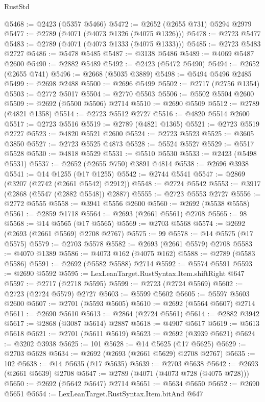 \begin{lexlean}{RustStd}
\begin{coremodule}
{\begin{coremodule}
{{{{{{{{{{{{{{{{{{{{{{{{{{{{{{{{{{{{{{{@5468 := @2423 (@5357 @5466)
@5472 := @2652 (@2655 @731) @5294 @2979
@5477 := @2789 (@4071 (@4073 @1326 (@4075 @1326)))
@5478 := @2723 @5477
@5483 := @2789 (@4071 (@4073 @1333 (@4075 @1333)))
@5485 := @2723 @5483 @2727
@5486 := @5478 @5485
@5487 := @3138 @5486
@5489 := @4069 @5487 @2600
@5490 := @2882 @5489
@5492 := @2423 (@5472 @5490)
@5494 := @2652 (@2655 @741)
@5496 := @2668 (@5035 @3889)
@5498 := @5494 @5496 @2485
@5499 := @2698 @2488
@5500 := @2696 @5499
@5502 := @2717 (@2756 @1354)
@5503 := @2772 @5017
@5504 := @2770 @5503
@5506 := @5502 @5504 @2600
@5509 := @2692 (@5500 @5506) @2714
@5510 := @2690 @5509
@5512 := @2789 (@4821 @1358)
@5514 := @2723 @5512 @2727
@5516 := @4820 @5514 @2600
@5517 := @2723 @5516
@5519 := @2789 (@4821 @1365)
@5521 := @2723 @5519 @2727
@5523 := @4820 @5521 @2600
@5524 := @2723 @5523
@5525 := @3605 @3850
@5527 := @2723 @5525 @4873
@5528 := @5524 @5527
@5529 := @5517 @5528
@5530 := @4818 @5529
@5531 := @5510 @5530
@5533 := @2423 (@5498 @5531)
@5537 := @2652 (@2655 @750) @3891 @4814
@5538 := @2696 @3938
@5541 := @14 @1255 (@17 @1255)
@5542 := @2744 @5541
@5547 := @2869 (@3207 (@2742 (@2661 @5542) @2912))
@5548 := @2724 @5542
@5553 := @3917 (@2868 (@5547 (@2882 @5548)) @2887)
@5555 := @2723 @5553 @2727
@5556 := @2772 @5555
@5558 := @3941 @5556 @2600
@5560 := @2692 (@5538 @5558)
@5561 := @2859 @1718
@5564 := @2693 (@2661 @5561) @2708
@5565 := 98
@5568 := @14 @5565 (@17 @5565)
@5569 := @2703 @5568
@5574 := @2692 (@2693 (@2661 @5569) @2708 @2767)
@5575 := 99
@5578 := @14 @5575 (@17 @5575)
@5579 := @2703 @5578
@5582 := @2693 (@2661 @5579) @2708
@5583 := @4070 @1389
@5586 := @4073 @162 (@4075 @162)
@5588 := @2789 (@5583 @5586)
@5591 := @2692 (@5582 @5588) @2714
@5592 := @5574 @5591
@5593 := @2690 @5592
@5595 := LexLeanTarget.RustSyntax.Item.shiftRight @647
@5597 := @2717 (@2718 @5595)
@5599 := @2723 (@2724 @5569)
@5602 := @2723 (@2724 @5579) @2727
@5603 := @5599 @5602
@5605 := @5597 @5603 @2600
@5607 := @2701 (@5593 @5605)
@5610 := @2692 (@5564 @5607) @2714
@5611 := @2690 @5610
@5613 := @2864 (@2724 @5561)
@5614 := @2882 @3942
@5617 := @2868 (@3087 @5614) @2887
@5618 := @4907 @5617
@5619 := @5613 @5618
@5621 := @2701 (@5611 @5619)
@5623 := @2692 (@3939 @5621)
@5624 := @3202 @3938
@5625 := 101
@5628 := @14 @5625 (@17 @5625)
@5629 := @2703 @5628
@5634 := @2692 (@2693 (@2661 @5629) @2708 @2767)
@5635 := 102
@5638 := @14 @5635 (@17 @5635)
@5639 := @2703 @5638
@5642 := @2693 (@2661 @5639) @2708
@5647 := @2789 (@4071 (@4073 @728 (@4075 @728)))
@5650 := @2692 (@5642 @5647) @2714
@5651 := @5634 @5650
@5652 := @2690 @5651
@5654 := LexLeanTarget.RustSyntax.Item.bitAnd @647
}}}}}}}}}}}}}}}}}}}}}}}}}}}}}}}}}}}}}}}
\end{coremodule}}
\end{coremodule}
\end{lexlean}

